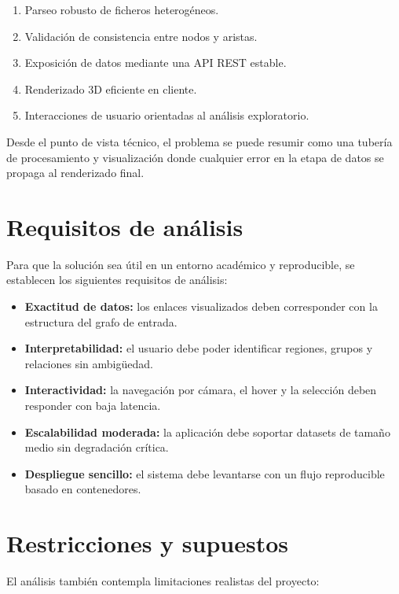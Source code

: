 \begin{enumerate}
	\item Parseo robusto de ficheros heterogéneos.
	\item Validación de consistencia entre nodos y aristas.
	\item Exposición de datos mediante una API REST estable.
	\item Renderizado 3D eficiente en cliente.
	\item Interacciones de usuario orientadas al análisis exploratorio.
\end{enumerate}

Desde el punto de vista técnico, el problema se puede resumir como una tubería de procesamiento y visualización donde cualquier error en la etapa de datos se propaga al renderizado final.

\section{Requisitos de análisis}

Para que la solución sea útil en un entorno académico y reproducible, se establecen los siguientes requisitos de análisis:

\begin{itemize}
	\item \textbf{Exactitud de datos:} los enlaces visualizados deben corresponder con la estructura del grafo de entrada.
	\item \textbf{Interpretabilidad:} el usuario debe poder identificar regiones, grupos y relaciones sin ambigüedad.
	\item \textbf{Interactividad:} la navegación por cámara, el hover y la selección deben responder con baja latencia.
	\item \textbf{Escalabilidad moderada:} la aplicación debe soportar datasets de tamaño medio sin degradación crítica.
	\item \textbf{Despliegue sencillo:} el sistema debe levantarse con un flujo reproducible basado en contenedores.
\end{itemize}

\section{Restricciones y supuestos}

El análisis también contempla limitaciones realistas del proyecto:

